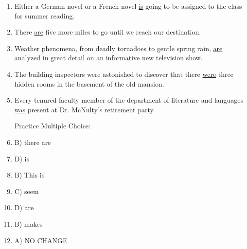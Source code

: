 \documentclass[12pt]{article}
\begin{document}
\begin{enumerate}
      \item Either a German novel or a French novel  \underline{is} going to be assigned to the class for summer reading.

      \item There  \underline{are} five more miles to go until we reach our destination.

      \item Weather phenomena, from deadly tornadoes to gentle spring rain,  \underline{are} analyzed in great detail on an informative new television show.

      \item The building inspectors were astonished to discover that there  \underline{were} three hidden rooms in the basement of the old mansion.

      \item Every tenured faculty member of the department of literature and languages  \underline{was} present at Dr. McNulty's retirement party.

        \begin{center}
          Practice Multiple Choice:
        \end{center}

        \setcounter{enumi}{0}

      \item B) there are

      \item D) is

      \item B) This is

      \item C) seem

      \item D) are

      \item B) makes

      \item A) NO CHANGE

    \end{enumerate}
\end{document}
